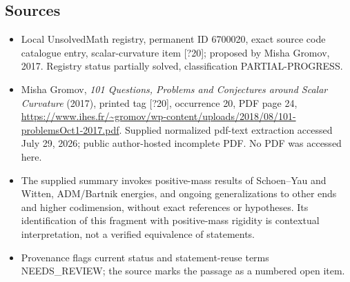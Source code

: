 \documentclass[11pt]{article}
\begin{document}
\subsection{Sources}
\begin{itemize}
\item Local UnsolvedMath registry, permanent ID 6700020, exact source code catalogue entry, scalar-curvature item [?20]; proposed by Misha Gromov, 2017. Registry status partially solved, classification PARTIAL-PROGRESS.
\item Misha Gromov, \emph{101 Questions, Problems and Conjectures around Scalar Curvature} (2017), printed tag [?20], occurrence 20, PDF page 24, \url{https://www.ihes.fr/~gromov/wp-content/uploads/2018/08/101-problemsOct1-2017.pdf}. Supplied normalized pdf-text extraction accessed July 29, 2026; public author-hosted incomplete PDF. No PDF was accessed here.
\item The supplied summary invokes positive-mass results of Schoen--Yau and Witten, ADM/Bartnik energies, and ongoing generalizations to other ends and higher codimension, without exact references or hypotheses. Its identification of this fragment with positive-mass rigidity is contextual interpretation, not a verified equivalence of statements.
\item Provenance flags current status and statement-reuse terms NEEDS\_REVIEW; the source marks the passage as a numbered open item.
\end{itemize}
\end{document}
